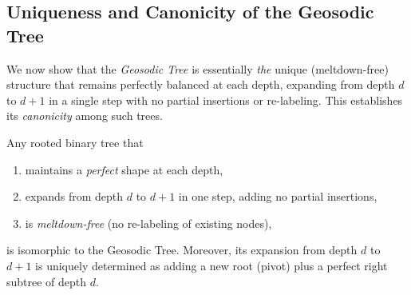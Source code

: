 \subsection{Uniqueness and Canonicity of the Geosodic Tree}
\label{subsec:uniqueness}

We now show that the \emph{Geosodic Tree} is essentially \emph{the} unique
(meltdown-free) structure that remains perfectly balanced at each depth,
expanding from depth $d$ to $d+1$ in a single step with no partial
insertions or re-labeling. This establishes its \emph{canonicity} among such
trees.

\begin{theorem}
\label{thm:geosodic-uniqueness}
Any rooted binary tree that
\begin{enumerate}
  \item maintains a \emph{perfect} shape at each depth,
  \item expands from depth $d$ to $d+1$ in one step, adding no partial insertions,
  \item is \emph{meltdown-free} (no re-labeling of existing nodes),
\end{enumerate}
is isomorphic to the Geosodic Tree. Moreover, its expansion from depth $d$ to
$d+1$ is uniquely determined as adding a new root (pivot) plus a perfect right
subtree of depth $d$.
\end{theorem}

